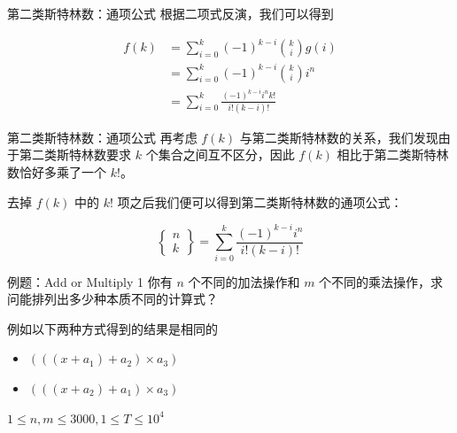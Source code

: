 \documentclass[12pt,aspectratio=169,handout]{beamer}
\begin{document}
\begin{frame}[fragile]{第二类斯特林数：通项公式}
根据二项式反演，我们可以得到

$$
\begin{aligned}
f(k) &= \sum_{i=0}^{k} (-1)^{k-i} {k \choose i} g(i) \\
     &= \sum_{i=0}^{k} (-1)^{k-i} {k \choose i} i^n \\
     &= \sum_{i=0}^{k} \frac{(-1)^{k-i} i^n k!}{i! (k-i)!}
\end{aligned}
$$
\end{frame}

\begin{frame}[fragile]{第二类斯特林数：通项公式}
再考虑 $f(k)$ 与第二类斯特林数的关系，我们发现由于第二类斯特林数要求 $k$ 个集合之间互不区分，因此 $f(k)$ 相比于第二类斯特林数恰好多乘了一个 $k!$。

去掉 $f(k)$ 中的 $k!$ 项之后我们便可以得到第二类斯特林数的通项公式：

$$
\begin{Bmatrix}n\\ k\end{Bmatrix} = \sum_{i=0}^{k} \frac{(-1)^{k-i} i^n}{i! (k-i)!}
$$
\end{frame}

\begin{frame}[fragile]{例题：Add or Multiply 1}
  你有 $n$ 个不同的加法操作和 $m$ 个不同的乘法操作，求问能排列出多少种本质不同的计算式？

  例如以下两种方式得到的结果是相同的

  \begin{itemize}
    \item $(((x + a_1) + a_2) \times a_3)$
    \item $(((x + a_2) + a_1) \times a_3)$
  \end{itemize}

  $1 \le n, m \le 3000, 1 \le T \le 10^4$
\end{frame}





\end{document}
